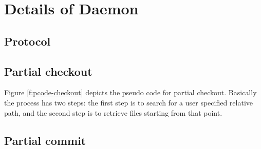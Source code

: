 \section{Details of \Sys Daemon}
\label{s:daemon}


\subsection{Protocol}


\subsection{Partial checkout}



Figure \ref{f:pcode-checkout} depicts the pseudo code for partial checkout.
Basically the process has two steps: the first step is to search for a user
specified relative path, and the second step is to retrieve files starting from
that point. 

\subsection{Partial commit}


